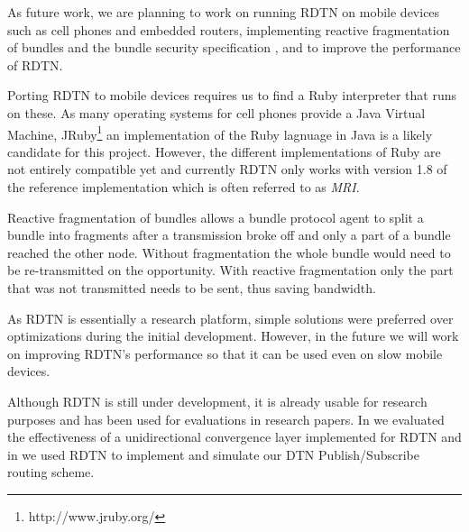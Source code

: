 \documentclass[a4paper]{article}
\begin{document}
As future work, we are planning to work on running RDTN on mobile devices such
as cell phones and embedded routers, implementing reactive fragmentation of
bundles and the bundle security specification \cite{bundle-security}, and to
improve the performance of RDTN.

Porting RDTN to mobile devices requires us to find a Ruby interpreter that runs
on these. As many operating systems for cell phones provide a Java Virtual
Machine, JRuby\footnote{http://www.jruby.org/} an implementation of the Ruby
lagnuage in Java is a likely candidate for this project. However, the different
implementations of Ruby are not entirely compatible yet and currently RDTN only
works with version 1.8 of the reference implementation which is often referred
to as {\em MRI}.

Reactive fragmentation of bundles allows a bundle protocol agent to split a
bundle into fragments after a transmission broke off and only a part of a bundle
reached the other node. Without fragmentation the whole bundle would need to be
re-transmitted on the opportunity. With reactive fragmentation only the 
part that was not transmitted needs to be sent, thus saving bandwidth.

As RDTN is essentially a research platform, simple solutions were preferred over
optimizations during the initial development. However, in the future we will
work on improving RDTN's performance so that it can be used even on slow mobile
devices.

Although RDTN is still under development, it is already usable for research
purposes and has been used for evaluations in research papers.  In \cite{nsdr07}
we evaluated the effectiveness of a unidirectional convergence layer implemented
for RDTN and in \cite{dtn-pubsub} we used RDTN to implement and simulate our DTN
Publish/Subscribe routing scheme.


\end{document}
